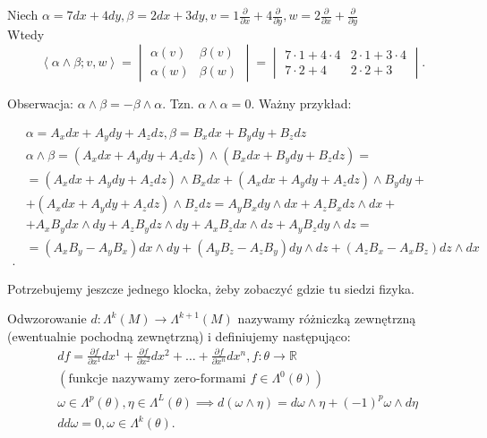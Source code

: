 \documentclass[../main.tex]{subfiles}
\begin{document}
    \begin{przyklad}
        Niech $\alpha = 7dx + 4dy, \beta = 2dx+3dy, v = 1 \frac{\partial }{\partial x} + 4 \frac{\partial }{\partial y} , w = 2 \frac{\partial }{\partial x} + \frac{\partial }{\partial y}$\\
        Wtedy
        \[
            \left<\alpha\land\beta;v,w \right> = \begin{vmatrix}\alpha(v)&\beta(v)\\ \alpha(w)&\beta(w)\end{vmatrix} = \begin{vmatrix}7\cdot 1+4\cdot 4& 2\cdot 1+3\cdot 4 \\ 7\cdot 2+4 & 2\cdot 2+3 \end{vmatrix}
        .\]
    \end{przyklad}
    Obserwacja: $\alpha\land\beta = -\beta\land\alpha$. Tzn. $\alpha\land\alpha = 0$.
    Ważny przykład:
    \begin{przyklad}
        \begin{align*}
            &\alpha = A_xdx + A_ydy + A_zdz, \beta = B_xdx + B_ydy + B_zdz\\
            & \alpha\land\beta = \left( A_xdx + A_ydy + A_zdz \right) \land \left( B_xdx + B_ydy + B_zdz \right) = \\
            &= \left( A_xdx+A_ydy+A_zdz \right) \land B_xdx + \left( A_xdx+A_ydy+A_zdz \right) \land B_ydy + \\
            &+ \left( A_xdx+A_ydy+A_zdz \right) \land B_zdz = A_yB_xdy\land dx + A_zB_x dz\land dx +   \\
            &+ A_xB_y dx\land dy + A_zB_ydz\land dy + A_xB_zdx\land dz + A_yB_zdy\land dz = \\
            &=  \left( A_xB_y - A_yB_x \right) dx\land dy + \left( A_yB_z - A_zB_y \right) dy\land dz + \left( A_zB_x - A_xB_z \right) dz\land dx\\
        .\end{align*}
    \end{przyklad}
    Potrzebujemy jeszcze jednego klocka, żeby zobaczyć gdzie tu siedzi fizyka.
    \begin{definicja}
        Odwzorowanie $d: \Lambda^k(M)\to\Lambda^{k+1}(M)$ nazywamy różniczką zewnętrzną (ewentualnie pochodną zewnętrzną) i definiujemy następująco:
        \begin{align*}
            &df = \frac{\partial f}{\partial x^1} dx^1 + \frac{\partial f}{\partial x^2} dx^2 + \ldots + \frac{\partial f}{\partial x^n} dx^n, f: \theta \to \mathbb{R}\\
            &(\text{funkcje nazywamy zero-formami }f\in \Lambda^0(\theta))\\
            &\omega\in\Lambda^p(\theta), \eta\in \Lambda^L(\theta) \implies d(\omega\land\eta) = d\omega\land\eta + (-1)^p\omega\land d\eta \\
            &dd\omega = 0, \omega\in\Lambda^k(\theta)
        .\end{align*}
    \end{definicja}
\end{document}
